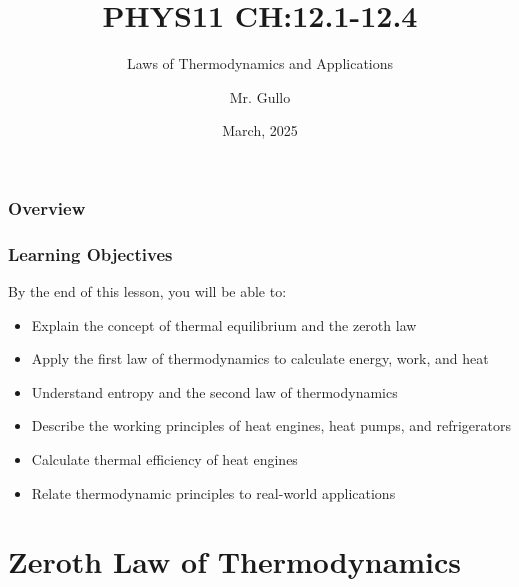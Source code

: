 \documentclass{beamer}
\title[Thermodynamics]{PHYS11 CH:12.1-12.4}
\subtitle{Laws of Thermodynamics and Applications}
\author[Mr. Gullo]{Mr. Gullo}
\date[March 2025]{March, 2025}
\institute{Physics Department}
\begin{document}
\begin{frame}
    \titlepage
\end{frame}

\begin{frame}
    \frametitle{Overview}
    \tableofcontents
\end{frame}

\begin{frame}
    \frametitle{Learning Objectives}
    \begin{block}{By the end of this lesson, you will be able to:}
        \begin{itemize}
            \item Explain the concept of thermal equilibrium and the zeroth law
            \item Apply the first law of thermodynamics to calculate energy, work, and heat
            \item Understand entropy and the second law of thermodynamics
            \item Describe the working principles of heat engines, heat pumps, and refrigerators
            \item Calculate thermal efficiency of heat engines
            \item Relate thermodynamic principles to real-world applications
        \end{itemize}
    \end{block}
\end{frame}

\section{Zeroth Law of Thermodynamics}
\end{document}
